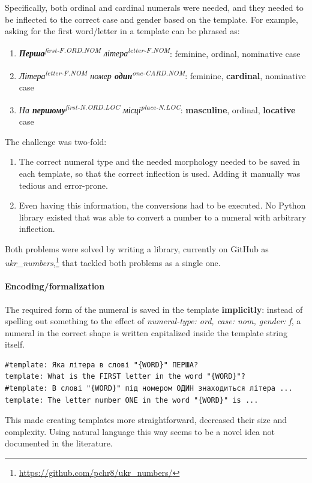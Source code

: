 Specifically, both ordinal and cardinal numerals were needed, and they needed to be inflected to the correct case and gender based on the template.
For example, asking for the first word/letter in a template can be phrased as:
\begin{enumerate}
    \tightlist
    \item \textit{\textbf{Перша}\textsuperscript{first-F.ORD.NOM} літера\textsuperscript{letter-F.NOM}}: feminine, ordinal, nominative case
    \item \textit{Літера\textsuperscript{letter-F.NOM} номер \textbf{один}\textsuperscript{one-CARD.NOM}}: feminine, \textbf{cardinal}, nominative case
    \item \textit{На \textbf{першому}\textsuperscript{first-N.ORD.LOC} місці\textsuperscript{place-N.LOC}}: \textbf{masculine}, ordinal, \textbf{locative} case
\end{enumerate}
The challenge was two-fold:
\begin{enumerate}
    \tightlist
    \item The correct numeral type and the needed morphology needed to be saved in each template, so that the correct inflection is used. Adding it manually was tedious and error-prone.
    \item Even having this information, the conversions had to be executed. No Python library existed that was able to convert a number to a numeral with arbitrary inflection.
\end{enumerate}
Both problems were solved by writing a library, currently on GitHub as \textit{ukr\_numbers},\footnote{\href{https://github.com/pchr8/ukr_numbers/}{https://github.com/pchr8/ukr\_numbers/}} that tackled both problems as a single one.

\paragraph{Encoding/formalization} The required form of the numeral 
is saved in the template \textbf{implicitly}: instead of spelling out something to the effect of 
\textit{numeral-type: ord, case: nom, gender: f}, a numeral in the correct shape is 
written capitalized inside the template string itself.

\begin{verbatim}
#template: Яка літера в слові "{WORD}" ПЕРША?
template: What is the FIRST letter in the word "{WORD}"?
#template: В слові "{WORD}" під номером ОДИН знаходиться літера ...
template: The letter number ONE in the word "{WORD}" is ...
\end{verbatim}
This made creating templates more straightforward, decreased their size and complexity.
Using natural language this way seems to be a novel idea not documented in the literature.


